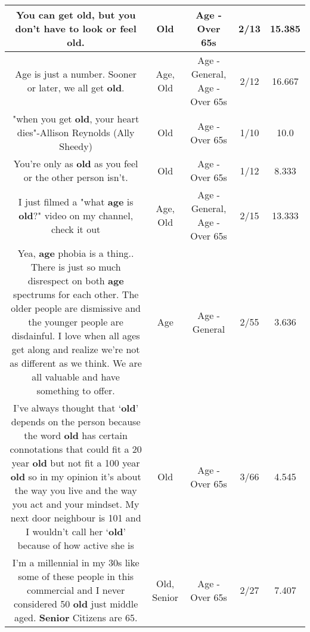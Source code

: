 \documentclass[11pt]{article}
\newlength\mylength
\begin{document}
\begin{center}
\begin{longtable}{|C{.65\mylength}|C{.30\mylength}|C{.12\mylength}|C{.12\mylength}|C{.12\mylength}|}
  \small You can get \textbf{old}, but you don't have to look or feel \textbf{old}.\normalsize   & Old & Age - Over 65s & 2/13 & 15.385 \\  \hline
  \small Age is just a number. Sooner or later, we all get \textbf{old}.\normalsize   & Age, Old & Age - General, Age - Over 65s & 2/12 & 16.667 \\  \hline
  \small "when you get \textbf{old}, your heart dies"-Allison Reynolds (Ally Sheedy)\normalsize   & Old & Age - Over 65s & 1/10 & 10.0 \\  \hline
  \small You're only as \textbf{old} as you feel or the other person isn't.\normalsize   & Old & Age - Over 65s & 1/12 & 8.333 \\  \hline
  \small I just filmed a "what \textbf{age} is \textbf{old}?" video on my channel, check it out\normalsize   & Age, Old & Age - General, Age - Over 65s & 2/15 & 13.333 \\  \hline
  \small Yea, \textbf{age} phobia is a thing.. There is just so much disrespect on both \textbf{age} spectrums for each other. The older people are dismissive and the younger people are disdainful. I love when all ages get along and realize we're not as different as we think. We are all valuable and have something to offer.\normalsize   & Age & Age - General & 2/55 & 3.636 \\  \hline
  \small I've always thought that ‘\textbf{old}' depends on the person because the word \textbf{old} has certain connotations that could fit a 20 year \textbf{old} but not fit a 100 year \textbf{old} so in my opinion it's about the way you live and the way you act and your mindset. My next door neighbour is 101 and I wouldn't call her ‘\textbf{old}' because of how active she is\normalsize   & Old & Age - Over 65s & 3/66 & 4.545 \\  \hline
  \small I'm a millennial in my 30s like some of these people in this commercial and I never considered 50 \textbf{old} just middle aged. \textbf{Senior} Citizens are 65.\normalsize   & Old, Senior & Age - Over 65s & 2/27 & 7.407 \\  \hline

\end{longtable}
\end{center}
\end{document}
